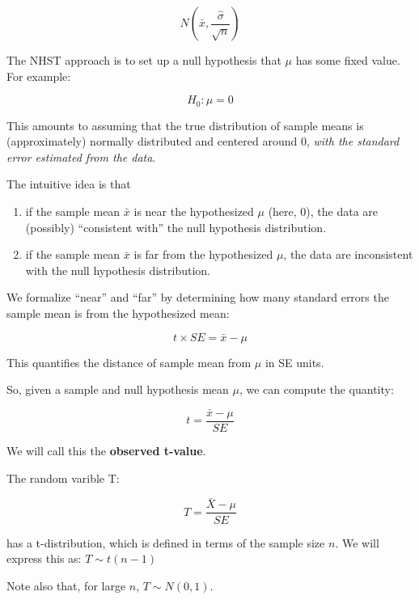 \documentclass[12pt]{article}
\begin{document}
\begin{equation}
N(\bar{x},\frac{\hat \sigma}{\sqrt{n}})
\end{equation}

The NHST approach is to set up a null hypothesis that $\mu$ has some fixed value. For example:

\begin{equation}
H_0: \mu = 0
\end{equation}

This amounts to assuming that the true distribution of sample means is (approximately) normally distributed and centered around 0, \textit{with the standard error estimated from the data}.

The intuitive idea is that 

\begin{enumerate}
\item
if the sample mean $\bar{x}$ is near the hypothesized $\mu$ (here, 0), the data are (possibly) ``consistent with'' the null hypothesis distribution.
\item
if the sample mean $\bar{x}$ is far from the hypothesized $\mu$, the data are inconsistent with the null hypothesis distribution.
\end{enumerate}

We formalize ``near'' and ``far'' by determining how many standard errors the sample mean is from the hypothesized mean:

\begin{equation}
t \times SE = \bar{x} - \mu 
\end{equation}

This quantifies the distance of sample mean from $\mu$ in SE units.


So, given a sample and null hypothesis mean $\mu$, we can compute the quantity: 

\begin{equation}
t  = \frac{\bar{x} - \mu}{SE}
\end{equation}

We will call this the \textbf{observed t-value}.

The random varible T:

\begin{equation}
T  = \frac{\bar{X} - \mu}{SE}
\end{equation}

has a t-distribution, which is defined in terms of the sample size $n$. 
We will express this as: $T \sim t(n-1)$ 

Note also that, for large $n$, $T\sim N(0,1)$. 
\end{document}
